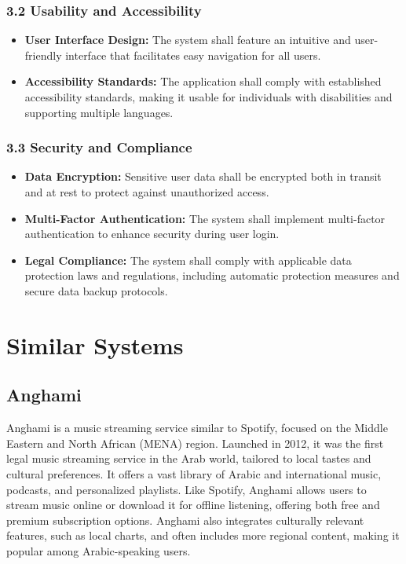 \documentclass[a4paper,10pt]{article}
\begin{document}
\subsubsection{3.2 Usability and Accessibility}
    \begin{itemize}[leftmargin=*]
        \item \textbf{User Interface Design:} The system shall feature an intuitive and user-friendly interface that facilitates easy navigation for all users.
        \item \textbf{Accessibility Standards:} The application shall comply with established accessibility standards, making it usable for individuals with disabilities and supporting multiple languages.
    \end{itemize}

\subsubsection{3.3 Security and Compliance}
    \begin{itemize}[leftmargin=*]
        \item \textbf{Data Encryption:} Sensitive user data shall be encrypted both in transit and at rest to protect against unauthorized access.
        \item \textbf{Multi-Factor Authentication:} The system shall implement multi-factor authentication to enhance security during user login.
        \item \textbf{Legal Compliance:} The system shall comply with applicable data protection laws and regulations, including automatic protection measures and secure data backup protocols.
    \end{itemize}

\section{Similar Systems}
\subsection{Anghami}
Anghami is a music streaming service similar to Spotify, focused on the Middle Eastern and North African (MENA) region. Launched in 2012, it was the first legal music streaming service in the Arab world, tailored to local tastes and cultural preferences. It offers a vast library of Arabic and international music, podcasts, and personalized playlists. Like Spotify, Anghami allows users to stream music online or download it for offline listening, offering both free and premium subscription options. Anghami also integrates culturally relevant features, such as local charts, and often includes more regional content, making it popular among Arabic-speaking users.
\end{document}
